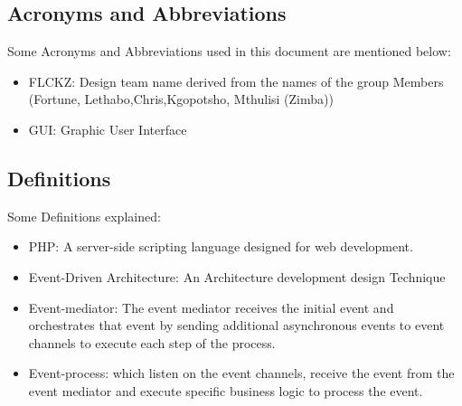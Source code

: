 \documentclass{article}
\begin{document}
\subsection{{Acronyms and Abbreviations}}
Some Acronyms and Abbreviations used in this document are mentioned below:
\begin{itemize}
\item FLCKZ: Design team name derived from the names of the group Members (Fortune, Lethabo,Chris,Kgopotsho, Mthulisi (Zimba))
\item GUI: Graphic User Interface 

\end{itemize}
\subsection{{Definitions}}
Some Definitions explained:
\begin{itemize}
\item PHP: A server-side scripting language designed for web development.
\item Event-Driven Architecture: An Architecture development design Technique
\item Event-mediator: The event mediator receives the initial event and
orchestrates that event by sending additional asynchronous events
to event channels to execute each step of the process.
\item Event-process: which listen on the event channels, receive the event from the
event mediator and execute specific business logic to process the
event.


\end{itemize}
\end{document}
